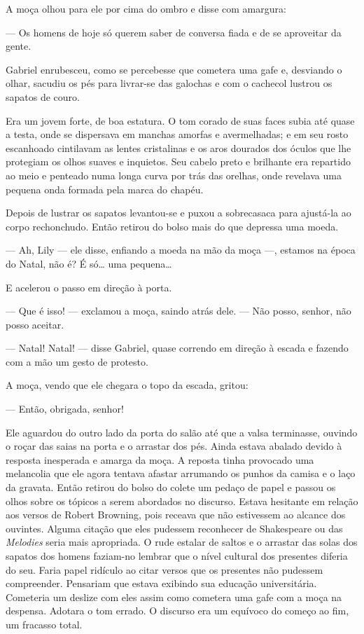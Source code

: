 A moça olhou para ele por cima do ombro e disse com amargura:

--- Os homens de hoje só querem saber de conversa fiada e de se aproveitar da
gente.

Gabriel enrubesceu, como se percebesse que cometera uma gafe e, desviando o
olhar, sacudiu os pés para livrar-se das galochas e com o cachecol lustrou os
sapatos de couro.

Era um jovem forte, de boa estatura.  O tom corado de suas faces subia até
quase a testa, onde se dispersava em manchas amorfas e avermelhadas; e em seu
rosto escanhoado cintilavam as lentes cristalinas e os aros dourados dos óculos
que lhe protegiam os olhos suaves e inquietos.  Seu cabelo preto e brilhante
era repartido ao meio e penteado numa longa curva por trás das orelhas, onde
revelava uma pequena onda formada pela marca do chapéu.

Depois de lustrar os sapatos levantou-se e puxou a sobrecasaca para ajustá-la
ao corpo rechonchudo.  Então retirou do bolso mais do que depressa uma moeda.

--- Ah, Lily --- ele disse, enfiando a moeda na mão da moça ---, estamos na
época do Natal, não é?  É só\ldots{} uma pequena\ldots{}

E acelerou o passo em direção à porta.

--- Que é isso! --- exclamou a moça, saindo atrás dele.  --- Não posso, senhor,
não posso aceitar.

--- Natal!  Natal! --- disse Gabriel, quase correndo em direção à escada e
fazendo com a mão um gesto de protesto.

A moça, vendo que ele chegara o topo da escada, gritou:

--- Então, obrigada, senhor!

Ele aguardou do outro lado da porta do salão até que a valsa terminasse,
ouvindo o roçar das saias na porta e o arrastar dos pés.  Ainda estava abalado
devido à resposta inesperada e amarga da moça.  A reposta tinha provocado uma
melancolia que ele agora tentava afastar arrumando os punhos da camisa e o laço
da gravata.  Então retirou do bolso do colete um pedaço de papel e passou os
olhos sobre os tópicos a serem abordados no discurso.  Estava hesitante em
relação aos versos de Robert Browning, pois receava que não estivessem ao
alcance dos ouvintes.  Alguma citação que eles pudessem reconhecer de
Shakespeare ou das \textit{Melodies} seria mais apropriada.  O rude estalar de
saltos e o arrastar das solas dos sapatos dos homens faziam-no lembrar que o
nível cultural dos presentes diferia do seu.  Faria papel ridículo ao citar
versos que os presentes não pudessem compreender.  Pensariam que estava
exibindo sua educação universitária.  Cometeria um deslize com eles assim como
cometera uma gafe com a moça na despensa.  Adotara o tom errado.  O discurso era um
equívoco do começo ao fim, um fracasso total.


